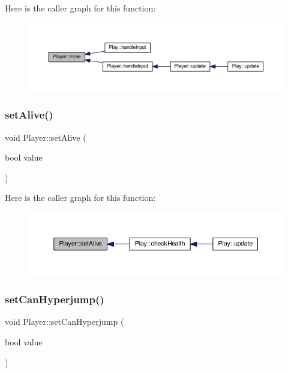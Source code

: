 Here is the caller graph for this function\+:
\nopagebreak
\begin{figure}[H]
\begin{center}
\leavevmode
\includegraphics[width=350pt]{class_player_a1b72ddc438471f7feb33b2b0b32cf303_icgraph}
\end{center}
\end{figure}
\mbox{\label{class_player_a6a05faf900b692306c66caa43b7ffb4f}} 
\subsubsection{\texorpdfstring{set\+Alive()}{setAlive()}}
{\footnotesize\ttfamily void Player\+::set\+Alive (\begin{DoxyParamCaption}\item[{bool}]{value }\end{DoxyParamCaption})}

Here is the caller graph for this function\+:
\nopagebreak
\begin{figure}[H]
\begin{center}
\leavevmode
\includegraphics[width=350pt]{class_player_a6a05faf900b692306c66caa43b7ffb4f_icgraph}
\end{center}
\end{figure}
\mbox{\label{class_player_ad3994801b0ca5d5da392302bbb56e0e8}} 
\subsubsection{\texorpdfstring{set\+Can\+Hyperjump()}{setCanHyperjump()}}
{\footnotesize\ttfamily void Player\+::set\+Can\+Hyperjump (\begin{DoxyParamCaption}\item[{bool}]{value }\end{DoxyParamCaption})}

